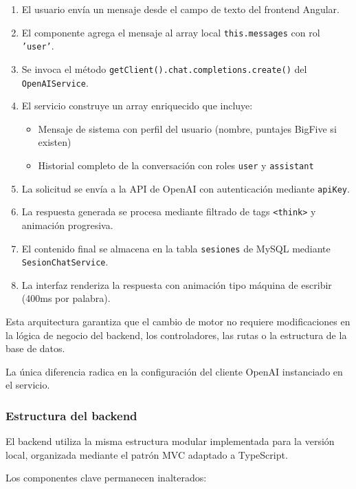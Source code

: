 \documentclass[12pt,a4paper]{report}
\numberwithin{figure}{section}
\begin{document}
\begin{enumerate}
  \item El usuario envía un mensaje desde el campo de texto del frontend Angular.
  \item El componente agrega el mensaje al array local \texttt{this.messages} con rol \texttt{'user'}.
  \item Se invoca el método \texttt{getClient().chat.completions.create()} del \texttt{OpenAIService}.
  \item El servicio construye un array enriquecido que incluye:
  \begin{itemize}
    \item Mensaje de sistema con perfil del usuario (nombre, puntajes BigFive si existen)
    \item Historial completo de la conversación con roles \texttt{user} y \texttt{assistant}
  \end{itemize}
  \item La solicitud se envía a la API de OpenAI con autenticación mediante \texttt{apiKey}.
  \item La respuesta generada se procesa mediante filtrado de tags \texttt{<think>} y animación progresiva.
  \item El contenido final se almacena en la tabla \texttt{sesiones} de MySQL mediante \texttt{SesionChatService}.
  \item La interfaz renderiza la respuesta con animación tipo máquina de escribir (400ms por palabra).
\end{enumerate}

Esta arquitectura garantiza que el cambio de motor no requiere modificaciones en la lógica de negocio del backend, los controladores, las rutas o la estructura de la base de datos. 

La única diferencia radica en la configuración del cliente OpenAI instanciado en el servicio.

\vspace{1em}
\subsubsection{Estructura del backend}
\label{subsubsec:backend_openai}

El backend utiliza la misma estructura modular implementada para la versión local, organizada mediante el patrón MVC adaptado a TypeScript. 

Los componentes clave permanecen inalterados:
\end{document}
